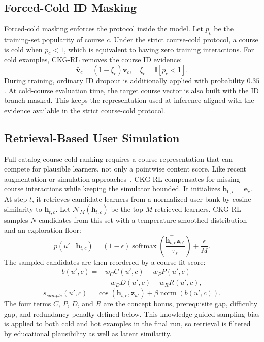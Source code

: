\documentclass[letterpaper]{article}
\begin{document}
\subsection{Forced-Cold ID Masking}
Forced-cold masking enforces the protocol inside the model. Let \(p_c\) be the training-set popularity of course \(c\). Under the strict course-cold protocol, a course is cold when \(p_c<1\), which is equivalent to having zero training interactions. For cold examples, CKG-RL removes the course ID evidence:
\begin{equation}
\bar{\mathbf{v}}_c=(1-\xi_c)\mathbf{v}_c,
\quad
\xi_c=\mathbb{I}[p_c<1].
\end{equation}
During training, ordinary ID dropout is additionally applied with probability \(0.35\). At cold-course evaluation time, the target course vector is also built with the ID branch masked. This keeps the representation used at inference aligned with the evidence available in the strict course-cold protocol.

\subsection{Retrieval-Based User Simulation}
Full-catalog course-cold ranking requires a course representation that can compete for plausible learners, not only a pointwise content score. Like recent augmentation or simulation approaches~\cite{wang2024llmaugmenter,huang2025coldllm}, CKG-RL compensates for missing course interactions while keeping the simulator bounded. It initializes \(\mathbf{h}_{0,c}=\mathbf{e}_c\). At step \(t\), it retrieves candidate learners from a normalized user bank by cosine similarity to \(\mathbf{h}_{t,c}\). Let \(\mathcal{N}_M(\mathbf{h}_{t,c})\) be the top-\(M\) retrieved learners. CKG-RL samples \(N\) candidates from this set with a temperature-smoothed distribution and an exploration floor:
\begin{equation}
p(u'\mid \mathbf{h}_{t,c})=
(1-\epsilon)\operatorname{softmax}
\left(\frac{\mathbf{h}_{t,c}^\top\mathbf{z}_{u'}}{\tau_s}\right)
+\frac{\epsilon}{M}.
\end{equation}
The sampled candidates are then reordered by a course-fit score:
\begin{equation}
\begin{aligned}
b(u',c)=&
w_C C(u',c)-w_P P(u',c)\\
&-w_D D(u',c)-w_R R(u',c),
\end{aligned}
\end{equation}
\begin{equation}
s_{sample}(u',c)=
\cos(\mathbf{h}_{t,c},\mathbf{z}_{u'})
+\beta\operatorname{norm}(b(u',c)).
\end{equation}
The four terms \(C\), \(P\), \(D\), and \(R\) are the concept bonus, prerequisite gap, difficulty gap, and redundancy penalty defined below. This knowledge-guided sampling bias is applied to both cold and hot examples in the final run, so retrieval is filtered by educational plausibility as well as latent similarity.
\end{document}
